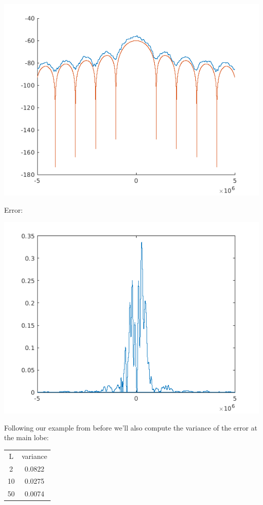 \documentclass[conference,9pt]{IEEEtran}
\begin{document}
\includegraphics[scale=0.6]{barlett50.png}

Error:

\includegraphics[scale=0.6]{me50.png}

Following our example from before we'll also compute the variance of the error at the main lobe:

\begin{center}
  \begin{tabular}{ c c }
   L & variance \\
   2 &  0.0822 \\
   10 &  0.0275 \\
   50 & 0.0074    
  \end{tabular}
\end{center}
\end{document}
